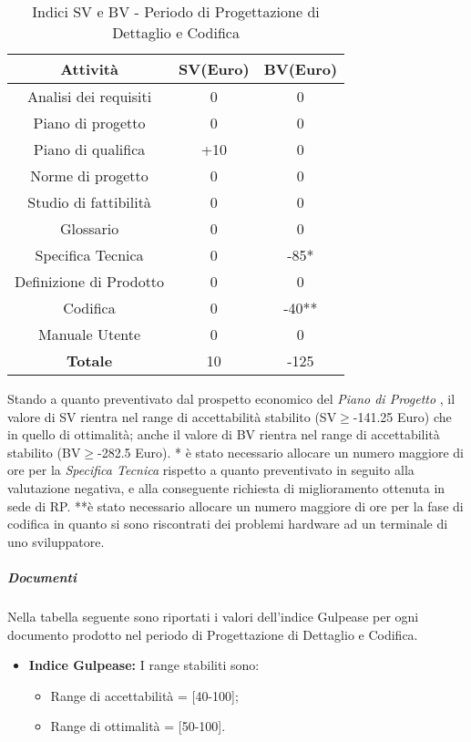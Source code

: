        
      \begin{table}[H]
        \centering
        \begin{tabular}{|c|c|c|}
          \hline
          \textbf{Attività} & \textbf{SV}(Euro)  & \textbf{BV}(Euro) \\
          \hline
          Analisi dei requisiti  & 0 & 0  \\
          Piano di progetto & 0 & 0\\
          Piano di qualifica  & +10  & 0\\
          Norme di progetto & 0  & 0 \\
          Studio di fattibilità & 0  & 0  \\
          Glossario & 0  & 0  \\
          Specifica Tecnica & 0 & -85*\\
          Definizione di Prodotto & 0 & 0\\
          Codifica & 0 & -40**\\
          Manuale Utente & 0 & 0\\
          \hline
          \textbf{Totale} & 10  & -125  \\
          \hline
        \end{tabular}
        \caption{Indici SV e BV - Periodo di Progettazione di Dettaglio e Codifica}
      \end{table}
      Stando a quanto preventivato dal prospetto economico del \emph{Piano di Progetto \VersionePP{}}, il valore di SV rientra nel range di accettabilità stabilito (SV\(\geq\)-141.25 Euro) che in quello di ottimalità;
      anche il valore di BV rientra nel range di accettabilità stabilito (BV\(\geq\)-282.5 Euro).
      * è stato necessario allocare un numero maggiore di ore per la \emph{Specifica Tecnica} rispetto a quanto preventivato in seguito alla valutazione negativa, e alla conseguente richiesta di miglioramento ottenuta in sede di RP.
      **è stato necessario allocare un numero maggiore di ore per la fase di codifica in quanto si sono riscontrati dei problemi hardware ad un terminale di uno sviluppatore.
      
      
      \subparagraph{Documenti}
      Nella tabella seguente sono riportati i valori dell'indice Gulpease per ogni documento prodotto nel periodo di Progettazione di Dettaglio e Codifica.\\

\begin{itemize}
\item \textbf{Indice Gulpease: }I range stabiliti sono:
      \begin{itemize}
        \item Range di accettabilità = [40-100];
        \item Range di ottimalità = [50-100].
      \end{itemize}
\end{itemize}      
      
